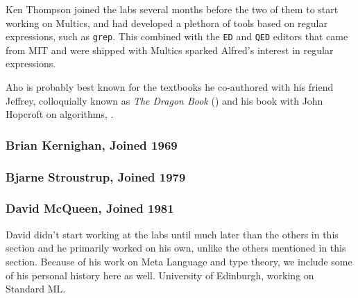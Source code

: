Ken Thompson joined the labs several months before the two of them to
start working on Multics, and had developed a plethora of tools based on
regular expressions, such as \texttt{grep}.
This combined with the \texttt{ED} and \texttt{QED} editors that came from MIT
and were shipped with Multics sparked Alfred's interest in regular expressions.

Aho is probably best known for the textbooks he co-authored with his friend Jeffrey,
colloquially known as \textit{The Dragon Book} ()
and his book with John Hopcroft on algorithms, .

\subsubsection{Brian Kernighan, Joined 1969}

\subsubsection{Bjarne Stroustrup, Joined 1979}



\subsubsection{David McQueen, Joined 1981}

David didn't start working at the labs until much later than the others in this section
and he primarily worked on his own, unlike the others mentioned in this section.
Because of his work on Meta Language and type theory, we include some of his personal history here
as well.
University of Edinburgh, working on Standard ML.
